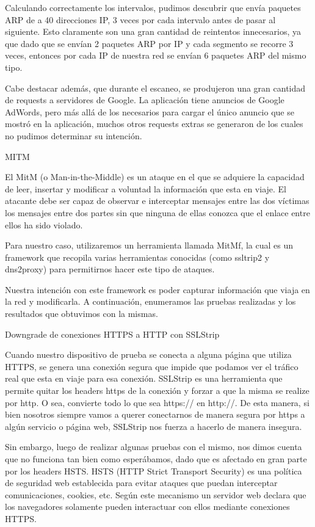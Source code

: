 Calculando correctamente los intervalos, pudimos descubrir que envía paquetes ARP de a 40 direcciones IP, 3 veces por cada intervalo antes de pasar al siguiente. Esto claramente son una gran cantidad de reintentos innecesarios, ya que dado que se envían 2 paquetes ARP por IP y cada segmento se recorre 3 veces, entonces por cada IP de nuestra red se envían 6 paquetes ARP del mismo tipo. 

Cabe destacar además, que durante el escaneo, se produjeron una gran cantidad de requests a servidores de Google. La aplicación tiene anuncios de Google AdWords, pero más allá de los necesarios para cargar el único anuncio que se mostró en la aplicación, muchos otros requests extras se generaron de los cuales no pudimos determinar su intención.



MITM

El MitM (o Man-in-the-Middle) es un ataque en el que se adquiere la capacidad de leer, insertar y modificar a voluntad la información que esta en viaje. El atacante debe ser capaz de observar e interceptar mensajes entre las dos víctimas los mensajes entre dos partes sin que ninguna de ellas conozca que el enlace entre ellos ha sido violado. 

Para nuestro caso, utilizaremos un herramienta llamada MitMf, la cual es un framework que recopila varias herramientas conocidas (como ssltrip2 y dns2proxy) para permitirnos hacer este tipo de ataques. 

Nuestra intención con este framework es poder capturar información que viaja en la red y modificarla. A continuación, enumeramos las pruebas realizadas y los resultados que obtuvimos con la mismas.

Downgrade de conexiones HTTPS a HTTP con SSLStrip

Cuando nuestro dispositivo de prueba se conecta a alguna página que utiliza HTTPS, se genera una conexión segura que impide que podamos ver el tráfico real que esta en viaje para esa conexión. SSLStrip es una herramienta que permite quitar los headers https de la conexión y forzar a que la misma se realize por http. O sea, convierte todo lo que sea https:// en http://. De esta manera, si bien nosotros siempre vamos a querer conectarnos de manera segura por https a algún servicio o página web, SSLStrip nos fuerza a hacerlo de manera insegura.

Sin embargo, luego de realizar algunas pruebas con el mismo, nos dimos cuenta que no funciona tan bien como esperábamos, dado que es afectado en gran parte por los headers HSTS. HSTS (HTTP Strict Transport Security) es una política de seguridad web establecida para evitar ataques que puedan interceptar comunicaciones, cookies, etc. Según este mecanismo un servidor web declara que los navegadores solamente pueden interactuar con ellos mediante conexiones HTTPS. 

